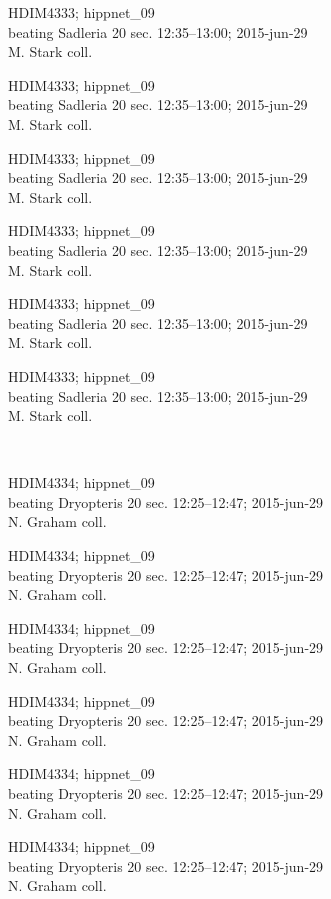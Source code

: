 \documentclass[2pt]{extarticle}
\begin{document}
\noindent
\parbox{0.16\textwidth}{\tiny \raggedright \rule[-0.3\baselineskip]{0pt}{10pt}HDIM4333; hippnet\_09\\ beating Sadleria 20 sec. 12:35--13:00; 2015-jun-29\\ M. Stark coll.}
\parbox{0.16\textwidth}{\tiny \raggedright \rule[-0.3\baselineskip]{0pt}{10pt}HDIM4333; hippnet\_09\\ beating Sadleria 20 sec. 12:35--13:00; 2015-jun-29\\ M. Stark coll.}
\parbox{0.16\textwidth}{\tiny \raggedright \rule[-0.3\baselineskip]{0pt}{10pt}HDIM4333; hippnet\_09\\ beating Sadleria 20 sec. 12:35--13:00; 2015-jun-29\\ M. Stark coll.}
\parbox{0.16\textwidth}{\tiny \raggedright \rule[-0.3\baselineskip]{0pt}{10pt}HDIM4333; hippnet\_09\\ beating Sadleria 20 sec. 12:35--13:00; 2015-jun-29\\ M. Stark coll.}
\parbox{0.16\textwidth}{\tiny \raggedright \rule[-0.3\baselineskip]{0pt}{10pt}HDIM4333; hippnet\_09\\ beating Sadleria 20 sec. 12:35--13:00; 2015-jun-29\\ M. Stark coll.}
\parbox{0.16\textwidth}{\tiny \raggedright \rule[-0.3\baselineskip]{0pt}{10pt}HDIM4333; hippnet\_09\\ beating Sadleria 20 sec. 12:35--13:00; 2015-jun-29\\ M. Stark coll.} \\ 
\vspace{0.001in} 

\noindent
\parbox{0.16\textwidth}{\tiny \raggedright \rule[-0.3\baselineskip]{0pt}{10pt}HDIM4334; hippnet\_09\\ beating Dryopteris 20 sec. 12:25--12:47; 2015-jun-29\\ N. Graham coll.}
\parbox{0.16\textwidth}{\tiny \raggedright \rule[-0.3\baselineskip]{0pt}{10pt}HDIM4334; hippnet\_09\\ beating Dryopteris 20 sec. 12:25--12:47; 2015-jun-29\\ N. Graham coll.}
\parbox{0.16\textwidth}{\tiny \raggedright \rule[-0.3\baselineskip]{0pt}{10pt}HDIM4334; hippnet\_09\\ beating Dryopteris 20 sec. 12:25--12:47; 2015-jun-29\\ N. Graham coll.}
\parbox{0.16\textwidth}{\tiny \raggedright \rule[-0.3\baselineskip]{0pt}{10pt}HDIM4334; hippnet\_09\\ beating Dryopteris 20 sec. 12:25--12:47; 2015-jun-29\\ N. Graham coll.}
\parbox{0.16\textwidth}{\tiny \raggedright \rule[-0.3\baselineskip]{0pt}{10pt}HDIM4334; hippnet\_09\\ beating Dryopteris 20 sec. 12:25--12:47; 2015-jun-29\\ N. Graham coll.}
\parbox{0.16\textwidth}{\tiny \raggedright \rule[-0.3\baselineskip]{0pt}{10pt}HDIM4334; hippnet\_09\\ beating Dryopteris 20 sec. 12:25--12:47; 2015-jun-29\\ N. Graham coll.} \\ 
\vspace{0.001in} 
\end{document}
